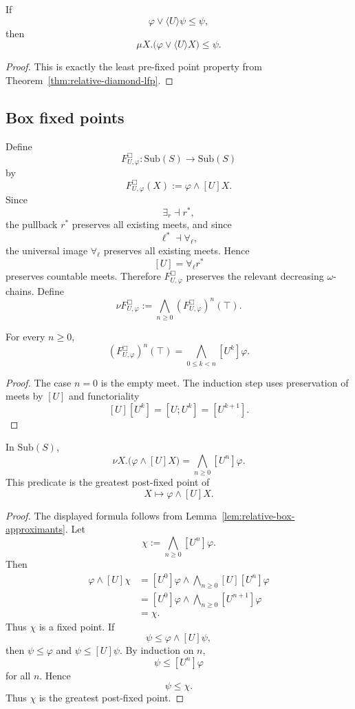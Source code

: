 \begin{corollary}
\label{cor:relative-diamond-induction}
If
\[
\varphi\vee\langle U\rangle\psi\le\psi,
\]
then
\[
\mu X.\bigl(\varphi\vee\langle U\rangle X\bigr)\le\psi.
\]
\end{corollary}

\begin{proof}
This is exactly the least pre-fixed point property from
Theorem~\ref{thm:relative-diamond-lfp}.
\end{proof}

\subsection{Box fixed points}

Define
\[
F^\Box_{U,\varphi}:\mathrm{Sub}(S)\to\mathrm{Sub}(S)
\]
by
\[
F^\Box_{U,\varphi}(X)
:=
\varphi\wedge[U]X.
\]
Since
\[
\exists_r\dashv r^\ast,
\]
the pullback \(r^\ast\) preserves all existing meets, and since
\[
\ell^\ast\dashv \forall_\ell,
\]
the universal image \(\forall_\ell\) preserves all existing meets. Hence
\[
[U]=\forall_\ell r^\ast
\]
preserves countable meets. Therefore \(F^\Box_{U,\varphi}\) preserves the
relevant decreasing \(\omega\)-chains. Define
\[
\nu F^\Box_{U,\varphi}
:=
\bigwedge_{n\ge0}(F^\Box_{U,\varphi})^n(\top).
\]

\begin{lemma}
\label{lem:relative-box-approximants}
For every \(n\ge0\),
\[
(F^\Box_{U,\varphi})^n(\top)
=
\bigwedge_{0\le k<n}[U^k]\varphi.
\]
\end{lemma}

\begin{proof}
The case \(n=0\) is the empty meet. The induction step uses preservation of
meets by \([U]\) and functoriality
\[
[U][U^k]=[U;U^k]=[U^{k+1}].
\]
\end{proof}

\begin{theorem}
\label{thm:relative-box-gfp}
In \(\mathrm{Sub}(S)\),
\[
\nu X.\bigl(\varphi\wedge[U]X\bigr)
=
\bigwedge_{n\ge0}[U^n]\varphi.
\]
This predicate is the greatest post-fixed point of
\[
X\mapsto \varphi\wedge[U]X.
\]
\end{theorem}

\begin{proof}
The displayed formula follows from
Lemma~\ref{lem:relative-box-approximants}. Let
\[
\chi:=\bigwedge_{n\ge0}[U^n]\varphi.
\]
Then
\[
\begin{aligned}
\varphi\wedge[U]\chi
&=
[U^0]\varphi
\wedge
\bigwedge_{n\ge0}[U][U^n]\varphi
\\
&=
[U^0]\varphi
\wedge
\bigwedge_{n\ge0}[U^{n+1}]\varphi
\\
&=
\chi.
\end{aligned}
\]
Thus \(\chi\) is a fixed point. If
\[
\psi\le \varphi\wedge[U]\psi,
\]
then \(\psi\le\varphi\) and \(\psi\le[U]\psi\). By induction on \(n\),
\[
\psi\le[U^n]\varphi
\]
for all \(n\). Hence
\[
\psi\le\chi.
\]
Thus \(\chi\) is the greatest post-fixed point.
\end{proof}

